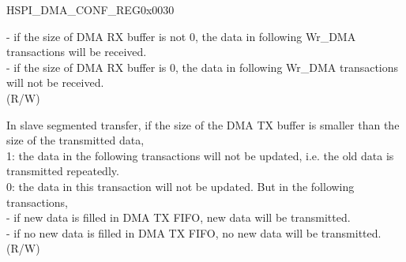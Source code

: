 \begin{register}{H}{SPI\_DMA\_CONF\_REG}{0x0030}
\begin{regdesc}
\begin{reglist}
        - if the size of DMA RX buffer is not 0, the data in following Wr\_DMA transactions will be received.\\
        - if the size of DMA RX buffer is 0, the data in following Wr\_DMA transactions will not be received.\\
 (R/W)
\label{fielddesc:SPISLVTXSEGTRANSCLREN}\item [SPI\_SLV\_TX\_SEG\_TRANS\_CLR\_EN] In slave segmented transfer, if the size of the DMA TX buffer is smaller than the size of the transmitted data,\\
1: the data in the following transactions will not be updated, i.e. the old data is transmitted repeatedly.\\
0: the data in this transaction will not be updated. But in the following transactions,\\
    
        - if new data is filled in DMA TX FIFO, new data will be transmitted.\\
        - if no new data is filled in DMA TX FIFO, no new data will be transmitted.\\
 (R/W)
\item [Continued on the next page...]
\end{reglist}\end{regdesc}
\end{register}

